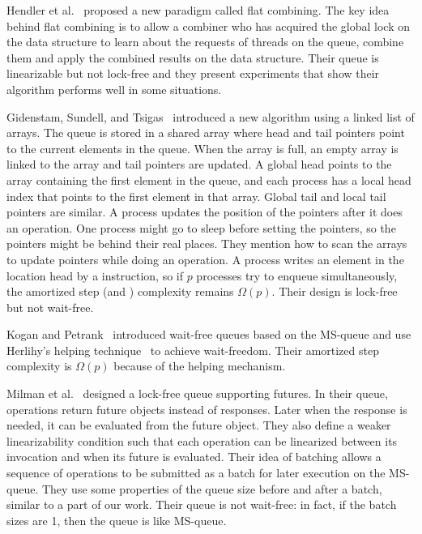 Hendler et al.~\cite{DBLP:conf/spaa/HendlerIST10} proposed a new
paradigm called flat combining. The key idea behind flat combining is
to allow a combiner who has acquired the global lock on the data
structure to learn about the requests of threads on the queue, combine
them and apply the combined results on the data structure. Their queue
is linearizable but not lock-free and they present experiments that
show their algorithm performs well in some situations. 

Gidenstam, Sundell, and Tsigas~\cite{DBLP:conf/opodis/GidenstamST10}
introduced a new algorithm using a linked list of arrays. The queue is
stored in a shared array where head and tail pointers point to the
current elements in the queue. When the array is full, an empty array
is linked to the array and tail pointers are updated. A global head
points to the array containing the first element in the queue, and
each process has a local head index that points to the first element
in that array. Global tail and local tail pointers are similar. A
process updates the position of the pointers after it does an
operation. One process might go to sleep before setting the pointers,
so the pointers might be behind their real places. They mention how to
scan the arrays to update pointers while doing an operation. A process
writes an element in the location head by a  instruction, so
if $p$ processes try to enqueue simultaneously, the amortized step
(and ) complexity remains $\Omega(p)$. Their design is
lock-free but not wait-free. 

Kogan and Petrank~\cite{DBLP:conf/ppopp/KoganP11} introduced wait-free
queues based on the MS-queue and use Herlihy's helping
technique~\cite{10.1145/114005.102808} to achieve wait-freedom. Their
amortized step complexity is $\Omega(p)$ because of the helping
mechanism. 

Milman et al.~\cite{DBLP:conf/spaa/MilmanKLLP18} designed a lock-free
queue supporting futures. In their queue, operations  return future
objects instead of responses. Later when the response is needed, it
can be evaluated from the future object. They also define a weaker
linearizability condition such that each operation can be linearized
between its invocation and when its future is evaluated. Their idea of
batching allows a sequence of operations to be submitted as a batch
for later execution on the MS-queue. They use some properties of the
queue size before and after a batch, similar to a part of our
work. Their queue is not wait-free: in fact, if the batch sizes are 1,
then the queue is like MS-queue. 

